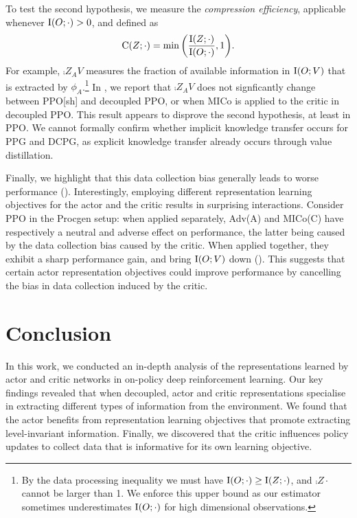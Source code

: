 To test the second hypothesis, we measure the \textit{compression efficiency}, applicable whenever $\text{I}(O;\cdot)>0$, and defined as
\begin{equation}\label{c2:eqn:compression-eff}
\text{C}(Z;\cdot) = \min\bigg(\frac{\text{I}(Z;\cdot)}{\text{I}(O;\cdot)}, 1\bigg).
\end{equation}
For example, $\comp{Z_A}{V}$ measures the fraction of available information in $\text{I}(O;V)$ that is extracted by $\phi_A$.\footnote{By the data processing inequality we must have $\text{I}(O;\cdot)\geq\text{I}(Z;\cdot)$, and $\comp{Z}{\cdot}$ cannot be larger than 1. We enforce this upper bound as our estimator sometimes underestimates $\text{I}(O;\cdot)$ for high dimensional observations.} In , we report that $\comp{Z_A}{V}$ does not signficantly change between PPO[sh] and decoupled PPO, or when MICo is applied to the critic in decoupled PPO. This result appears to disprove the second hypothesis, at least in PPO. We cannot formally confirm whether implicit knowledge transfer occurs for PPG and DCPG, as explicit knowledge transfer already occurs through value distillation.

Finally, we highlight that this data collection bias generally leads to worse performance (). Interestingly, employing different representation learning objectives for the actor and the critic results in surprising interactions. Consider PPO in the Procgen setup: when applied separately, Adv(A) and MICo(C) have respectively a neutral and adverse effect on performance, the latter being caused by the data collection bias caused by the critic. When applied together, they exhibit a sharp performance gain, and bring $\text{I}(O;V)$ down (). This suggests that certain actor representation objectives could improve performance by cancelling the bias in data collection induced by the critic.
%
\section{Conclusion}
In this work, we conducted an in-depth analysis of the representations learned by actor and critic networks in on-policy deep reinforcement learning. Our key findings revealed that when decoupled, actor and critic representations specialise in extracting different types of information from the environment. We found that the actor benefits from representation learning objectives that promote extracting level-invariant information. Finally, we discovered that the critic influences policy updates to collect data that is informative for its own learning objective.

